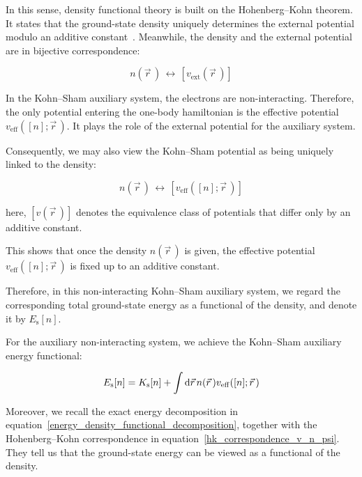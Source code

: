 In this sense, density functional theory is built on the Hohenberg--Kohn theorem.
It states that the ground-state density uniquely determines the external potential modulo an additive constant~\cite{hohenberg1964inhomogeneous,kohn1999nobel}.
Meanwhile, the density and the external potential are in bijective correspondence:

\begin{equation}
    n(\vec{r}\,)
    \,\longleftrightarrow\,
    \left[v_\mathrm{ext}(\vec{r}\,)\right]
\label{HK_density_potential_correspondence}
\end{equation}

In the Kohn--Sham auxiliary system, the electrons are non-interacting.
Therefore, the only potential entering the one-body hamiltonian is the effective potential $v_\mathrm{eff}([n];\vec{r}\,)$.
It plays the role of the external potential for the auxiliary system.

Consequently, we may also view the Kohn--Sham potential as being uniquely linked to the density:

\begin{equation}
    n(\vec{r}\,)
    \,\longleftrightarrow\,
    \left[v_\mathrm{eff}([n];\vec{r}\,)\right]
\label{KS_density_potential_correspondence}
\end{equation}

here, $\left[v(\vec{r}\,)\right]$ denotes the equivalence class of potentials that differ only by an additive constant.

This shows that once the density $n(\vec{r}\,)$ is given, the effective potential $v_\mathrm{eff}([n];\vec{r}\,)$ is fixed up to an additive constant.

Therefore, in this non-interacting Kohn--Sham auxiliary system, we regard the corresponding total ground-state energy as a functional of the density, and denote it by $E_\mathrm{s}[n]$.

For the auxiliary non-interacting system, we achieve the Kohn--Sham auxiliary energy functional:

\begin{equation}
    E_\mathrm{s}[n]=K_\mathrm{s}[n]+\int\mathrm{d}{\vec{r}}\,n(\vec{r}\,)v_\mathrm{eff}([n];\vec{r}\,)
\label{KS_auxiliary_energy_functional}
\end{equation}

Moreover, we recall the exact energy decomposition in equation~\eqref{energy_density_functional_decomposition},
together with the Hohenberg--Kohn correspondence in equation~\eqref{hk_correspondence_v_n_psi}.
They tell us that the ground-state energy can be viewed as a functional of the density.

